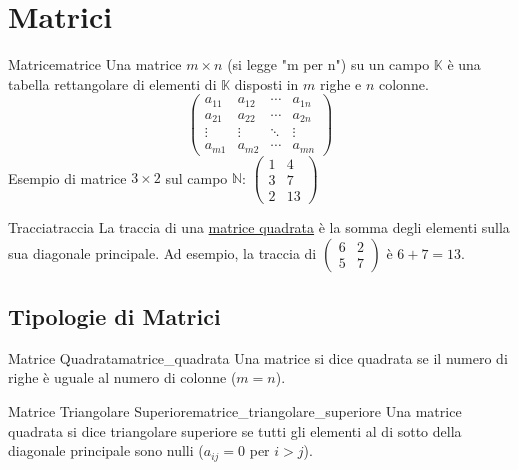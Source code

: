 \documentclass{article}
\begin{document}
\section{Matrici}

\begin{definition}{Matrice}{matrice}
    Una matrice $m \times n$ (si legge "m per n") su un campo $\mathbb{K}$ è una tabella rettangolare di elementi di $\mathbb{K}$ disposti in $m$ righe e $n$ colonne.
    \[ \begin{pmatrix}
    a_{11} & a_{12} & \cdots & a_{1n} \\
    a_{21} & a_{22} & \cdots & a_{2n} \\
    \vdots & \vdots & \ddots & \vdots \\
    a_{m1} & a_{m2} & \cdots & a_{mn}
    \end{pmatrix} \]
    Esempio di matrice $3 \times 2$ sul campo $\mathbb{N}$: $\begin{pmatrix} 1 & 4 \\ 3 & 7 \\ 2 & 13 \end{pmatrix}$
\end{definition}

\begin{definition}{Traccia}{traccia}
    La traccia di una \hyperref[def:matrice_quadrata]{matrice quadrata} è la somma degli elementi sulla sua diagonale principale. Ad esempio, la traccia di $\begin{pmatrix} 6 & 2 \\ 5 & 7 \end{pmatrix}$ è $6+7=13$.
\end{definition}

\subsection{Tipologie di Matrici}

\begin{definition}{Matrice Quadrata}{matrice_quadrata}
Una matrice si dice quadrata se il numero di righe è uguale al numero di colonne ($m=n$).
\end{definition}

\begin{definition}{Matrice Triangolare Superiore}{matrice_triangolare_superiore}
Una matrice quadrata si dice triangolare superiore se tutti gli elementi al di sotto della diagonale principale sono nulli ($a_{ij} = 0$ per $i>j$).
\end{definition}
\end{document}
